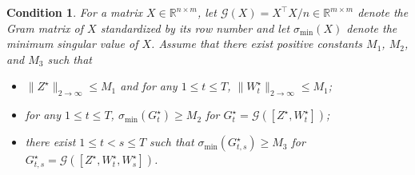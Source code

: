 \documentclass[12pt]{article}
\newtheorem{condition}{Condition}
\newcommand{\mytrans}{\top}
\begin{document}

\begin{condition} \label{cond:truevalue}
For a matrix $X \in \mathbb R^{n \times m}$, let $\mathcal{G}(X) = X^\mytrans X / n \in \mathbb R^{m \times m}$ denote the Gram matrix of $X$ standardized by its row number and let $\sigma
_{\operatorname{min}}(X)$ denote the minimum singular
value of $X$. 
Assume that there exist positive constants $M_1$, $M_2$, and $M_3$ such that
\begin{itemize}\setlength{\itemsep}{0pt}
\item[(i)]  $\|Z^{\star}\|_{2 \to \infty} \leqslant  M_{1}$ and for any $1\leqslant t \leqslant T$, $  \|W_{t}^{\star}\|_{2 \to \infty}
\leqslant  M_{1}$;

\item[(ii)] for any $1 \leqslant t \leqslant T$, 
$\sigma_{\operatorname{min}}(G_{t}^{\star})\geqslant M_2 $ for $G_t^{\star}=\mathcal{G}([Z^\star, W_t^\star]) $; 

\item[(iii)] there exist $1 \leqslant t < s \leqslant T$ such that $\sigma_{\operatorname{min}}(G_{t,s}^{\star} ) \geqslant M_3 $ for $G_{t,s}^{\star}=\mathcal{G}([Z^\star, W_{t}^\star, W_{s}^\star])$.
\end{itemize}
\end{condition}
\end{document}
